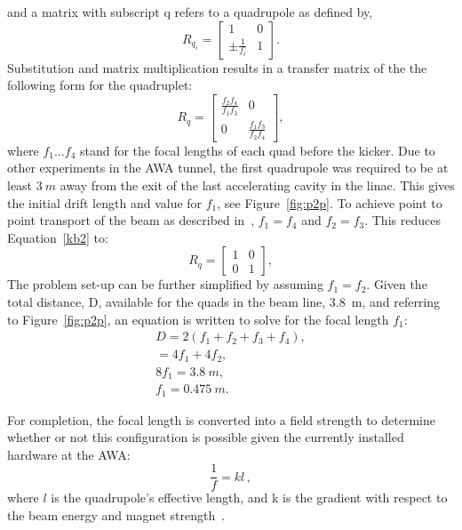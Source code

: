and a matrix with subscript q refers to a quadrupole as defined by,
\begin{equation}
R_{q_i} = 
\begin{bmatrix}
1 & 0 \\
\pm \frac{1}{f_i} & 1
\end{bmatrix}.
\end{equation}
Substitution and matrix multiplication results in a transfer matrix of the 
the following form for the quadruplet:
\begin{equation}
R_q = 
\begin{bmatrix}
\frac{f_2 f_4}{f_1 f_3} & 0 \\
0 & \frac{f_1 f_3}{f_2 f_4}	
\end{bmatrix},\label{kb2}
\end{equation}
where $f_1 \ldots f_4$ stand for the focal lengths of each quad before the kicker. 
Due to other experiments in the AWA tunnel, 
the first quadrupole was required to be at least $\SI{3}{m}$ away from the exit of the 
last accelerating cavity in the linac. This gives the initial drift length and value
for $f_1$, see Figure~\ref{fig:p2p}.
To achieve point to point transport of the beam as described in~\cite{brown}, 
$f_1 = f_4$ and $f_2 = f_3$. This reduces Equation~\ref{kb2} to:
\begin{equation}
R_q =
\begin{bmatrix}
1 & 0 \\
0 & 1	
\end{bmatrix},
\end{equation}
The problem set-up can be further simplified by assuming $f_1=f_2$. 
Given the total distance, D, available for the
quads in the beam line, \SI{3.8}{m}, and referring to Figure~\ref{fig:p2p}, 
an equation is written to solve for the focal length $f_1$: 
\begin{align}
D = 2 \left(f_1+f_2+f_3+f_4\right),\\
= 4f_1 + 4 f_2, \\
8f_1 = \SI{3.8}{m}, \\
f_1 = \SI{0.475}{m}.
\end{align}

For completion, the focal length is converted into a field strength 
to determine whether or not this configuration is possible given 
the currently installed hardware at the AWA: 
\begin{equation}
\frac{1}{f} = kl\, ,
\end{equation}
where $l$ is the quadrupole's effective length, and k is the gradient with respect to  
the beam energy and magnet strength~\cite{Wiedemann}.

